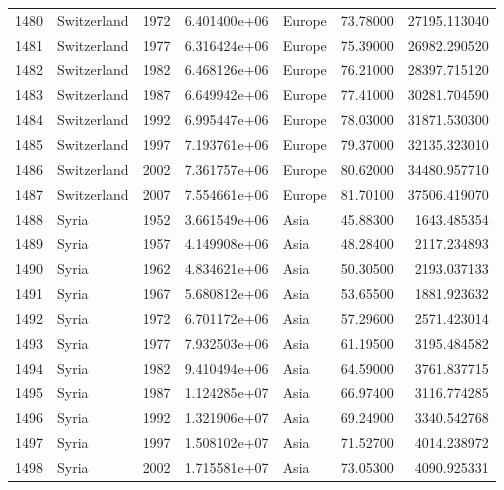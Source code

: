 \documentclass[
  letterpaper,
  DIV=11,
  numbers=noendperiod]{scrreprt}
\begin{document}
\begin{tabular}{llrrlrr}
1480 &               Switzerland &  1972 &  6.401400e+06 &    Europe &  73.78000 &   27195.113040 \\
1481 &               Switzerland &  1977 &  6.316424e+06 &    Europe &  75.39000 &   26982.290520 \\
1482 &               Switzerland &  1982 &  6.468126e+06 &    Europe &  76.21000 &   28397.715120 \\
1483 &               Switzerland &  1987 &  6.649942e+06 &    Europe &  77.41000 &   30281.704590 \\
1484 &               Switzerland &  1992 &  6.995447e+06 &    Europe &  78.03000 &   31871.530300 \\
1485 &               Switzerland &  1997 &  7.193761e+06 &    Europe &  79.37000 &   32135.323010 \\
1486 &               Switzerland &  2002 &  7.361757e+06 &    Europe &  80.62000 &   34480.957710 \\
1487 &               Switzerland &  2007 &  7.554661e+06 &    Europe &  81.70100 &   37506.419070 \\
1488 &                     Syria &  1952 &  3.661549e+06 &      Asia &  45.88300 &    1643.485354 \\
1489 &                     Syria &  1957 &  4.149908e+06 &      Asia &  48.28400 &    2117.234893 \\
1490 &                     Syria &  1962 &  4.834621e+06 &      Asia &  50.30500 &    2193.037133 \\
1491 &                     Syria &  1967 &  5.680812e+06 &      Asia &  53.65500 &    1881.923632 \\
1492 &                     Syria &  1972 &  6.701172e+06 &      Asia &  57.29600 &    2571.423014 \\
1493 &                     Syria &  1977 &  7.932503e+06 &      Asia &  61.19500 &    3195.484582 \\
1494 &                     Syria &  1982 &  9.410494e+06 &      Asia &  64.59000 &    3761.837715 \\
1495 &                     Syria &  1987 &  1.124285e+07 &      Asia &  66.97400 &    3116.774285 \\
1496 &                     Syria &  1992 &  1.321906e+07 &      Asia &  69.24900 &    3340.542768 \\
1497 &                     Syria &  1997 &  1.508102e+07 &      Asia &  71.52700 &    4014.238972 \\
1498 &                     Syria &  2002 &  1.715581e+07 &      Asia &  73.05300 &    4090.925331 \\

\end{tabular}
\end{document}

